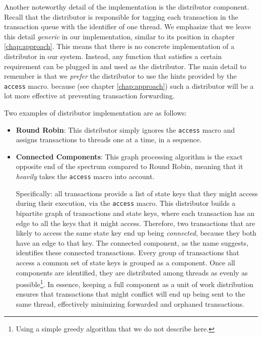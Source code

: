 Another noteworthy detail of the implementation is the distributor component. Recall that the
distributor is responsible for tagging each transaction in the transaction queue with the identifier
of one thread. We emphasize that we leave this detail \textit{generic} in our implementation,
similar to its position in chapter \ref{chap:approach}. This means that there is no concrete
implementation of a distributor in our system. Instead, any function that satisfies a certain
requirement can be plugged in and used as the distributor. The main detail to remember is that we
\textit{prefer} the distributor to use the hints provided by the \texttt{access} macro. because (see
chapter \ref{chap:approach}) such a distributor will be a lot more effective at preventing
transaction forwarding.

Two examples of distributor implementation are as follows:

\begin{itemize}
    \item \textbf{Round Robin}: This distributor simply ignores the \texttt{access} macro and
    assigns transactions to threads one at a time, in a sequence.
    \item \textbf{Connected Components}\cite{nuutilaFindingStronglyConnected1994}: This graph
    processing algorithm is the exact opposite end of the spectrum compared to Round Robin, meaning
    that it \textit{heavily} takes the \texttt{access} macro into account.

    Specifically: all transactions provide a list of state keys that they might access during their
    execution, via the \texttt{access} macro. This distributor builds a bipartite graph of
    transactions and state keys, where each transaction has an edge to all the keys that it might
    access. Therefore, two transactions that are likely to access the same state key end up being
    \textit{connected}, because they both have an edge to that key. The connected component, as the
    name suggests, identifies these connected transactions. Every group of transactions that access
    a common set of state keys is grouped as a component. Once all components are identified, they are distributed among threads as evenly as possible\footnote{Using a simple greedy algorithm
    that we do not describe here.}. In essence, keeping a full component as a unit of work
    distribution ensures that transactions that might conflict will end up being sent to the same
    thread, effectively minimizing forwarded and orphaned transactions.
\end{itemize}

